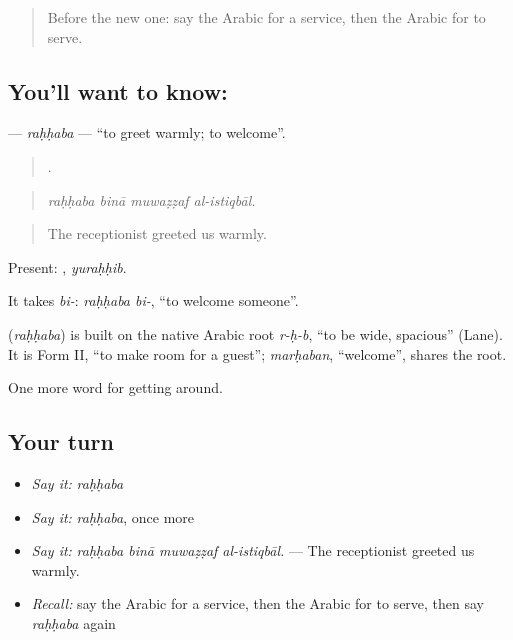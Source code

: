 \label{lesson:AR-C446-rahhaba}



\begin{quote}
Before the new one: say the Arabic for a service, then the Arabic for to serve.
\end{quote}

\subsection*{You'll want to know: }
\textbf{} — \emph{raḥḥaba} — \textquotedblleft{}to greet warmly; to welcome\textquotedblright{}.

\begin{quote}
   .
\end{quote}

\begin{quote}
\emph{raḥḥaba binā muwaẓẓaf al-istiqbāl.}
\end{quote}

\begin{quote}
The receptionist greeted us warmly.
\end{quote}

Present: , \emph{yuraḥḥib}.

It takes \emph{bi-}: \emph{raḥḥaba bi-}, \textquotedblleft{}to welcome someone\textquotedblright{}.

\begin{cousinweb}
\textbf{} (\emph{raḥḥaba}) is built on the native Arabic root \emph{r-ḥ-b}, \textquotedblleft{}to be wide, spacious\textquotedblright{} (Lane). It is Form II, \textquotedblleft{}to make room for a guest\textquotedblright{}; \emph{marḥaban}, \textquotedblleft{}welcome\textquotedblright{}, shares the root.
\end{cousinweb}

\begin{grammarlens}[title={What you've built}]
One more word for getting around.
\end{grammarlens}

\subsection*{Your turn}
\begin{itemize}
\raggedright
  \item \emph{Say it:} \emph{raḥḥaba}
  \item \emph{Say it:} \emph{raḥḥaba}, once more
  \item \emph{Say it:} \emph{raḥḥaba binā muwaẓẓaf al-istiqbāl.} — The receptionist greeted us warmly.
  \item \emph{Recall:} say the Arabic for a service, then the Arabic for to serve, then say \emph{raḥḥaba} again
\end{itemize}

